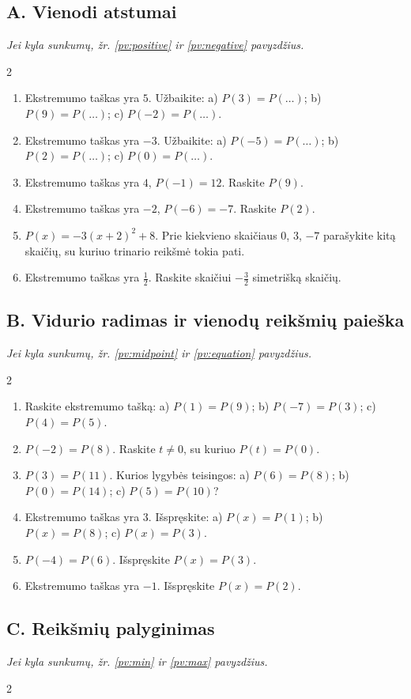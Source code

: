 \documentclass[11pt,a4paper]{scrartcl}
\newcommand{\hint}[1]{{\small\itshape Jei kyla sunkumų, žr. #1 pavyzdžius.}\par}
\begin{document}
\subsection*{A. Vienodi atstumai}
\hint{\ref{pv:positive} ir \ref{pv:negative}}
\begin{multicols}{2}\begin{enumerate}
\item Ekstremumo taškas yra $5$. Užbaikite: a) $P(3)=P(\ldots)$; b) $P(9)=P(\ldots)$; c) $P(-2)=P(\ldots)$.
\item Ekstremumo taškas yra $-3$. Užbaikite: a) $P(-5)=P(\ldots)$; b) $P(2)=P(\ldots)$; c) $P(0)=P(\ldots)$.
\item Ekstremumo taškas yra $4$, $P(-1)=12$. Raskite $P(9)$.
\item Ekstremumo taškas yra $-2$, $P(-6)=-7$. Raskite $P(2)$.
\item $P(x)=-3(x+2)^2+8$. Prie kiekvieno skaičiaus $0$, $3$, $-7$ parašykite kitą skaičių, su kuriuo trinario reikšmė tokia pati.
\item Ekstremumo taškas yra $\frac12$. Raskite skaičiui $-\frac32$ simetrišką skaičių.
\end{enumerate}\end{multicols}\subsection*{B. Vidurio radimas ir vienodų reikšmių paieška}\hint{\ref{pv:midpoint} ir \ref{pv:equation}}\begin{multicols}{2}\begin{enumerate}[start=7]
\item Raskite ekstremumo tašką: a) $P(1)=P(9)$; b) $P(-7)=P(3)$; c) $P(4)=P(5)$.
\item $P(-2)=P(8)$. Raskite $t\ne0$, su kuriuo $P(t)=P(0)$.
\item $P(3)=P(11)$. Kurios lygybės teisingos: a) $P(6)=P(8)$; b) $P(0)=P(14)$; c) $P(5)=P(10)$?
\item Ekstremumo taškas yra $3$. Išspręskite: a) $P(x)=P(1)$; b) $P(x)=P(8)$; c) $P(x)=P(3)$.
\item $P(-4)=P(6)$. Išspręskite $P(x)=P(3)$.
\item Ekstremumo taškas yra $-1$. Išspręskite $P(x)=P(2)$.
\end{enumerate}\end{multicols}\newpage\subsection*{C. Reikšmių palyginimas}\hint{\ref{pv:min} ir \ref{pv:max}}\begin{multicols}{2}\begin{enumerate}[start=13]

\end{enumerate}
\end{multicols}
\end{document}
